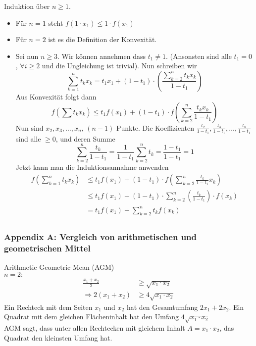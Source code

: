 \begin{beweis}{5.44}
Induktion über $n\geq 1$.\\
\begin{itemize}
\item Für $n=1$ steht $f(1\cdot x_1)\leq 1\cdot f(x_1)$ \checkmark
\item Für $n=2$ ist es die Definition der Konvexität.
\item Sei nun $n\geq 3$. Wir können annehmen dass $t_1\not=1$. (Ansonsten sind alle $t_1=0$, $\forall i\geq 2$ und die Ungleichung ist trivial). Nun schreiben wir
\[\sum\limits_{k = 1}^n {{t_k}{x_k}}  = {t_1}{x_1} + \left( {1 - {t_1}} \right) \cdot \left( {\frac{{\sum\limits_{k = 2}^n {{t_k}{x_k}} }}{{1 - {t_1}}}} \right)\]
Aus Konvexität folgt dann
\[f\left( \sum t_kx_k \right)\leq t_1f(x_1)+\left( 1-t_1\right)\cdot f\left( \sum\limits_{k=2}^n \frac{t_k x_k}{1-t_1}\right)\]
Nun sind $x_2,x_3,\dots, x_n$, $(n-1)$ Punkte. Die Koeffizienten $\frac{t_2}{1-t_1},\frac{t_3}{1-t_1},\dots,\frac{t_n}{1-t_1}$ sind alle $\geq 0$, und deren Summe
\[\sum\limits_{k = 2}^n {\frac{{{t_k}}}{{1 - {t_1}}}}  = \frac{1}{{1 - {t_1}}}\sum\limits_{k = 2}^n {{t_k}}  = \frac{{1 - {t_1}}}{{1 - {t_1}}} = 1\]
Jetzt kann man die Induktionsannahme anwenden
\begin{align*}
f\left( \sum\limits_{k = 1}^n {{t_k}{x_k}} \right)&\leq t_1f(x_1)+\left( 1-t_1\right)\cdot f\left( \sum\limits_{k = 2}^n \frac{t_k}{1-t_1}x_k\right)\\
&\leq t_1f(x_1)+\left( 1-t_1\right)\cdot\sum\limits_{k = 2}^n \left(\frac{t_k}{1-t_1}\right)\cdot f(x_k)\\
&= t_1f(x_1)+\sum\limits_{k = 2}^n t_k f(x_k)\\
\end{align*}
\end{itemize}
\end{beweis}

\newpage
\subsubsection*{Appendix A: Vergleich von arithmetischen und geometrischen Mittel}
Arithmetic Geometric Mean (AGM) \\
$n=2:$
\begin{align*}
\frac{x_1+x_2}{2}&\geq\sqrt{x_1\cdot x_2}\\
\Rightarrow 2(x_1+x_2)&\geq 4\sqrt{x_1\cdot x_2}
\end{align*}
Ein Rechteck mit dem Seiten $x_1$ und $x_2$ hat den Gesamtumfang $2x_1+2x_2$. Ein Quadrat mit dem gleichen Flächeninhalt hat den Umfang $4\sqrt{x_1\cdot x_2}$\\

AGM sagt, dass unter allen Rechtecken mit gleichem Inhalt $A=x_1\cdot x_2$, das Quadrat den kleinsten Umfang hat.




